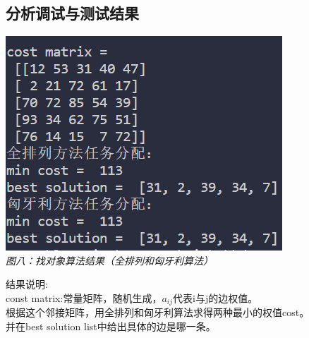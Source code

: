 \documentclass[UTF8,a4paper]{article}
\begin{document}
\subsection{分析调试与测试结果}

\begin{center}
    \includegraphics[scale=0.8]{找对象binary.png}\\
    \textit{图八：找对象算法结果（全排列和匈牙利算法）}
\end{center}
结果说明:\\
const matrix:常量矩阵，随机生成，$a_{ij}$代表i与j的边权值。\\
根据这个邻接矩阵，用全排列和匈牙利算法求得两种最小的权值cost。\\
并在best solution list中给出具体的边是哪一条。
\end{document}
